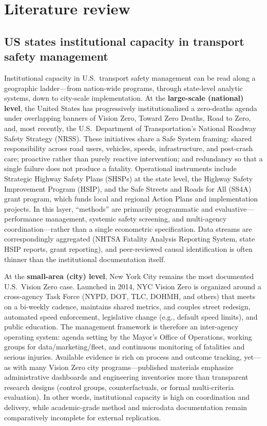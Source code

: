 \documentclass{article}
\begin{document}
\section{Literature review}

\subsection{US states institutional capacity in transport safety management}
Institutional capacity in U.S.\ transport safety management can be read along a geographic ladder---from nation-wide programs, through state-level analytic systems, down to city-scale implementation. At the \textbf{large-scale (national) level}, the United States has progressively institutionalized a zero-deaths agenda under overlapping banners of Vision Zero, Toward Zero Deaths, Road to Zero, and, most recently, the U.S.\ Department of Transportation's National Roadway Safety Strategy (NRSS). These initiatives share a Safe System framing: shared responsibility across road users, vehicles, speeds, infrastructure, and post-crash care; proactive rather than purely reactive intervention; and redundancy so that a single failure does not produce a fatality. Operational instruments include Strategic Highway Safety Plans (SHSPs) at the state level, the Highway Safety Improvement Program (HSIP), and the Safe Streets and Roads for All (SS4A) grant program, which funds local and regional Action Plans and implementation projects. In this layer, ``methods'' are primarily programmatic and evaluative---performance management, systemic safety screening, and multi-agency coordination---rather than a single econometric specification. Data streams are correspondingly aggregated (NHTSA Fatality Analysis Reporting System, state HSIP reports, grant reporting), and peer-reviewed causal identification is often thinner than the institutional documentation itself.

At the \textbf{small-area (city) level}, New York City remains the most documented U.S.\ Vision Zero case. Launched in 2014, NYC Vision Zero is organized around a cross-agency Task Force (NYPD, DOT, TLC, DOHMH, and others) that meets on a bi-weekly cadence, maintains shared metrics, and couples street redesign, automated speed enforcement, legislative change (e.g., default speed limits), and public education. The management framework is therefore an inter-agency operating system: agenda setting by the Mayor's Office of Operations, working groups for data/marketing/fleet, and continuous monitoring of fatalities and serious injuries. Available evidence is rich on process and outcome tracking, yet---as with many Vision Zero city programs---published materials emphasize administrative dashboards and engineering inventories more than transparent research designs (control groups, counterfactuals, or formal multi-criteria evaluation). In other words, institutional capacity is high on coordination and delivery, while academic-grade method and microdata documentation remain comparatively incomplete for external replication.
\end{document}
